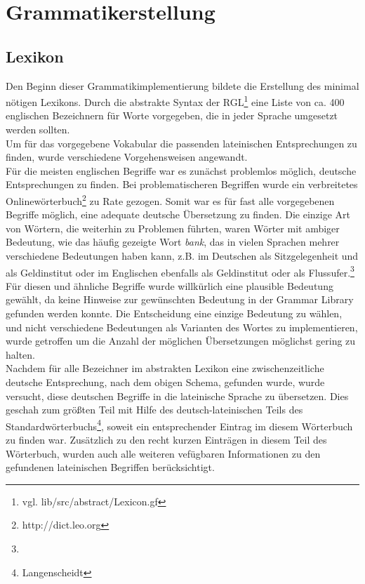 \documentclass[11pt]{scrartcl}
\begin{document}
\section{Grammatikerstellung}
\subsection{Lexikon}
Den Beginn dieser Grammatikimplementierung bildete die Erstellung des minimal nötigen Lexikons. Durch die abstrakte Syntax der RGL\footnote{vgl. lib/src/abstract/Lexicon.gf} eine Liste von ca. 400 englischen Bezeichnern für Worte vorgegeben, die in jeder Sprache umgesetzt werden sollten. \\
Um für das vorgegebene Vokabular die passenden lateinischen Entsprechungen zu finden, wurde verschiedene Vorgehensweisen angewandt. \\
Für die meisten englischen Begriffe war es zunächst problemlos möglich, deutsche Entsprechungen zu finden. Bei problematischeren Begriffen wurde ein verbreitetes Onlinewörterbuch\footnote{http://dict.leo.org} zu Rate gezogen. Somit war es für fast alle vorgegebenen Begriffe möglich, eine adequate deutsche Übersetzung zu finden. Die einzige Art von Wörtern, die weiterhin zu Problemen führten, waren Wörter mit ambiger Bedeutung, wie das häufig gezeigte Wort \textit{bank}, das in vielen Sprachen mehrer verschiedene Bedeutungen haben kann, z.B. im Deutschen als Sitzgelegenheit und als Geldinstitut oder im Englischen ebenfalls als Geldinstitut oder als Flussufer.\footnote{} Für diesen und ähnliche Begriffe wurde willkürlich eine plausible Bedeutung gewählt, da keine Hinweise zur gewünschten Bedeutung in der Grammar Library gefunden werden konnte. Die Entscheidung eine einzige Bedeutung zu wählen, und nicht verschiedene Bedeutungen als Varianten des Wortes zu implementieren, wurde getroffen um die Anzahl der möglichen Übersetzungen möglichst gering zu halten. \\
Nachdem für alle Bezeichner im abstrakten Lexikon eine zwischenzeitliche deutsche Entsprechung, nach dem obigen Schema, gefunden wurde, wurde versucht, diese deutschen Begriffe in die lateinische Sprache zu übersetzen. Dies geschah zum größten Teil mit Hilfe des deutsch-lateinischen Teils des Standardwörterbuchs\footnote{Langenscheidt}, soweit ein entsprechender Eintrag im diesem Wörterbuch zu finden war. Zusätzlich zu den recht kurzen Einträgen in diesem Teil des Wörterbuch, wurden auch alle weiteren vefügbaren Informationen zu den gefundenen lateinischen Begriffen berücksichtigt. \\
\end{document}
